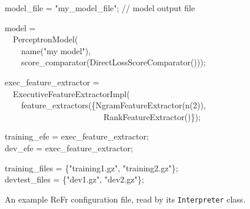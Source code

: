 \documentclass[a4paper]{article}
\newcommand\inlinecode[1]{\scriptsize\texttt{#1}\normalsize}
\let\textquotedbl="
\newenvironment{lyxcode}
{\par\begin{list}{}{
\scriptsize
\setlength{\leftmargin}{0.1in}
\setlength{\rightmargin}{\leftmargin}
\setlength{\listparindent}{0pt}%
\raggedright
\setlength{\itemsep}{0pt}
\setlength{\parsep}{0pt}
\normalfont\ttfamily}%
 \item[]}
{\end{list}}
\begin{document}
\begin{figure}
\begin{lyxcode}
\scriptsize
model\_file = \textquotedbl my\_model\_file\textquotedbl;  // model output file

model =\\
~~PerceptronModel(\\
~~~~name(\textquotedbl my model\textquotedbl),\\
~~~~score\_comparator(DirectLossScoreComparator()));

exec\_feature\_extractor =\\
~~ExecutiveFeatureExtractorImpl(\\
~~~~feature\_extractors(\{NgramFeatureExtractor(n(2)),\\
~~~~~~~~~~~~~~~~~~~~~~~~RankFeatureExtractor()\});

training\_efe = exec\_feature\_extractor;\\
dev\_efe = exec\_feature\_extractor;

training\_files = \{\textquotedbl training1.gz\textquotedbl,
\textquotedbl training2.gz\textquotedbl\};\\
devtest\_files = \{\textquotedbl dev1.gz\textquotedbl,
\textquotedbl dev2.gz\textquotedbl\};
\normalsize
\end{lyxcode}
\vspace{-0.2in}
\caption{\label{fig:interpreter-config}An example ReFr configuration file, read by its \inlinecode{Interpreter} class.}
\end{figure}


\end{document}

